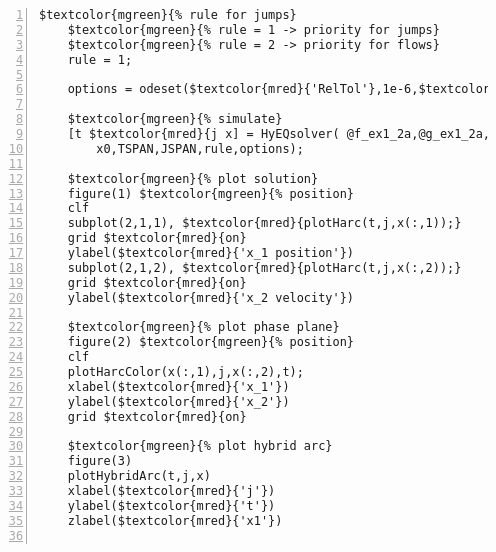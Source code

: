 \begin{Verbatim}[commandchars=\$\{\},numbers=left,numbersep=2pt]
    $textcolor{mgreen}{% rule for jumps} 
    $textcolor{mgreen}{% rule = 1 -> priority for jumps} 
    $textcolor{mgreen}{% rule = 2 -> priority for flows} 
    rule = 1; 
     
    options = odeset($textcolor{mred}{'RelTol'},1e-6,$textcolor{mred}{'MaxStep'},.1); 
     
    $textcolor{mgreen}{% simulate} 
    [t $textcolor{mred}{j x] = HyEQsolver( @f_ex1_2a,@g_ex1_2a,@C_ex1_2a,@D_ex1_2a,...} 
        x0,TSPAN,JSPAN,rule,options); 
     
    $textcolor{mgreen}{% plot solution} 
    figure(1) $textcolor{mgreen}{% position} 
    clf 
    subplot(2,1,1), $textcolor{mred}{plotHarc(t,j,x(:,1));} 
    grid $textcolor{mred}{on} 
    ylabel($textcolor{mred}{'x_1 position'}) 
    subplot(2,1,2), $textcolor{mred}{plotHarc(t,j,x(:,2));} 
    grid $textcolor{mred}{on} 
    ylabel($textcolor{mred}{'x_2 velocity'}) 
     
    $textcolor{mgreen}{% plot phase plane} 
    figure(2) $textcolor{mgreen}{% position} 
    clf 
    plotHarcColor(x(:,1),j,x(:,2),t); 
    xlabel($textcolor{mred}{'x_1'}) 
    ylabel($textcolor{mred}{'x_2'}) 
    grid $textcolor{mred}{on} 
     
    $textcolor{mgreen}{% plot hybrid arc} 
    figure(3) 
    plotHybridArc(t,j,x) 
    xlabel($textcolor{mred}{'j'}) 
    ylabel($textcolor{mred}{'t'}) 
    zlabel($textcolor{mred}{'x1'}) 
      
\end{Verbatim}  
  
\UndefineShortVerb{\$} 
\UndefineShortVerb{\#} 
 